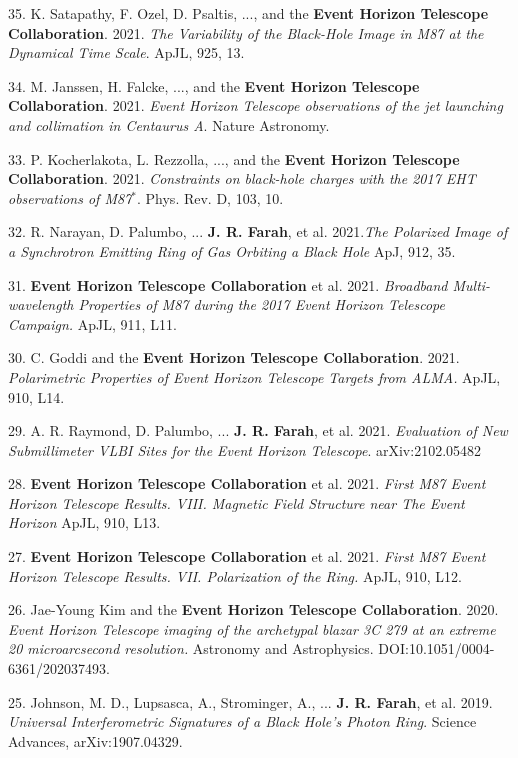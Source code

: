 \documentclass[margin,line]{res}
\begin{document}
\begin{resume}
35. K. Satapathy, F. Ozel, D. Psaltis, ..., and the \textbf{Event Horizon Telescope Collaboration}. 2021. \textit{The Variability of the Black-Hole Image in M87 at the Dynamical Time Scale}. ApJL, 925, 13.


34. M. Janssen, H. Falcke, ..., and the \textbf{Event Horizon Telescope Collaboration}. 2021. \textit{Event Horizon Telescope observations of the jet launching and collimation in Centaurus A}. Nature Astronomy.

33. P. Kocherlakota, L. Rezzolla, ..., and the \textbf{Event Horizon Telescope Collaboration}. 2021. \textit{Constraints on black-hole charges with the 2017 EHT observations of M87$^\ast$}. Phys. Rev. D, 103, 10.

32. R. Narayan, D. Palumbo, ... \textbf{J. R. Farah}, et al. 2021.\textit{The Polarized Image of a Synchrotron Emitting Ring of Gas Orbiting a Black Hole} ApJ, 912, 35.

31. \textbf{Event Horizon Telescope Collaboration} et al. 2021.\textit{ Broadband Multi-wavelength Properties of M87 during the 2017 Event Horizon Telescope Campaign.} ApJL, 911, L11.

30. C. Goddi and the \textbf{Event Horizon Telescope Collaboration}. 2021.\textit{ Polarimetric Properties of Event Horizon Telescope Targets from ALMA.} ApJL, 910, L14.

29. A. R. Raymond, D. Palumbo, ... \textbf{J. R. Farah}, et al. 2021. \textit{Evaluation of New Submillimeter VLBI Sites for the Event Horizon Telescope}. arXiv:2102.05482

28. \textbf{Event Horizon Telescope Collaboration} et al. 2021.\textit{ First M87 Event Horizon Telescope Results. VIII. Magnetic Field Structure near The Event Horizon} ApJL, 910, L13.

27. \textbf{Event Horizon Telescope Collaboration} et al. 2021.\textit{ First M87 Event Horizon Telescope Results. VII. Polarization of the Ring.} ApJL, 910, L12.




26. Jae-Young Kim and the \textbf{Event Horizon Telescope Collaboration}. 2020.\textit{ Event Horizon Telescope imaging of the archetypal blazar 3C 279 at an extreme 20 microarcsecond resolution.} Astronomy and Astrophysics. DOI:10.1051/0004-6361/202037493.

25. Johnson, M. D., Lupsasca, A., Strominger, A., ... \textbf{J. R. Farah}, et al. 2019. \textit{Universal Interferometric Signatures of a Black Hole’s Photon Ring}. Science Advances, arXiv:1907.04329.




\end{resume}
\end{document}
